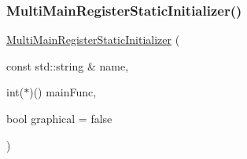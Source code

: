 \subsubsection{\texorpdfstring{Multi\+Main\+Register\+Static\+Initializer()}{MultiMainRegisterStaticInitializer()}}
{\footnotesize\ttfamily \mbox{\hyperlink{classstanfordcpplib_1_1MultiMainRegisterStaticInitializer}{Multi\+Main\+Register\+Static\+Initializer}} (\begin{DoxyParamCaption}\item[{const std\+::string \&}]{name,  }\item[{int($\ast$)()}]{main\+Func,  }\item[{bool}]{graphical = {\ttfamily false} }\end{DoxyParamCaption})}

